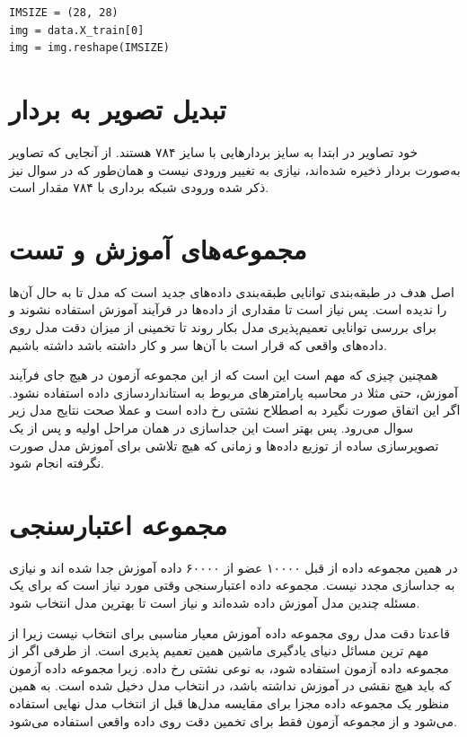 	\begin{program}[H]
	\begin{latin}
		
		\begin{verbatim}
IMSIZE = (28, 28)
img = data.X_train[0]
img = img.reshape(IMSIZE)
		\end{verbatim}
		
	\end{latin}
	\caption{ابعاد آرایه‌های مختلف مجموعه داده}
	\label{program:pic_dim_conversion}
\end{program}
\section{تبدیل تصویر به بردار}
خود تصاویر در ابتدا به سایز بردارهایی با سایز 
۷۸۴ هستند. از آنجایی که تصاویر به‌صورت بردار ذخیره شده‌اند، نیازی به تغییر ورودی نیست و همان‌طور که در سوال نیز ذکر شده ورودی شبکه برداری با ۷۸۴ مقدار است.
\section{مجموعه‌های آموزش و تست}
اصل هدف در طبقه‌بندی توانایی طبقه‌بندی داده‌های جدید است که مدل تا به حال آن‌ها را ندیده است. پس نیاز است تا مقداری از داده‌ها در فرآیند آموزش استفاده نشوند و برای بررسی توانایی تعمیم‌پذیری
مدل بکار روند تا تخمینی از میزان دقت مدل روی داده‌های واقعی که قرار است با آن‌ها سر و کار داشته باشد داشته باشیم. 

همچنین چیزی که مهم است این است که از این مجموعه آزمون در هیچ جای فرآیند آموزش، حتی مثلا در محاسبه پارامترهای مربوط به استاندارد‌سازی داده استفاده نشود. اگر این اتفاق صورت نگیرد به اصطلاح نشتی
رخ داده است و عملا صحت نتایج مدل زیر سوال می‌رود. پس بهتر است این جداسازی در همان مراحل اولیه و پس از یک تصویرسازی
ساده از توزیع داده‌ها و زمانی که هیچ تلاشی برای آموزش مدل صورت نگرفته انجام شود.

\section{مجموعه اعتبارسنجی}
در همین مجموعه داده از قبل ۱۰۰۰۰ عضو از ۶۰۰۰۰ داده آموزش جدا شده اند و نیازی به جداسازی مجدد نیست. مجموعه داده اعتبارسنجی وقتی مورد نیاز است که برای یک مسئله چندین مدل آموزش داده شده‌اند و نیاز است تا بهترین مدل انتخاب شود. 

قاعدتا دقت مدل روی مجموعه داده آموزش معیار  مناسبی برای انتخاب نیست زیرا از مهم ترین مسائل دنیای یادگیری ماشین همین تعمیم پذیری است. از طرفی اگر از مجموعه داده آزمون استفاده شود، به نوعی نشتی رخ داده. زیرا مجموعه داده آزمون که باید هیچ نقشی در آموزش نداشته باشد، در انتخاب مدل دخیل شده است. به همین منظور یک مجموعه داده مجزا برای مقایسه مدل‌ها قبل از انتخاب مدل نهایی استفاده می‌شود و از مجموعه آزمون فقط برای تخمین دقت روی داده واقعی استفاده می‌شود.

